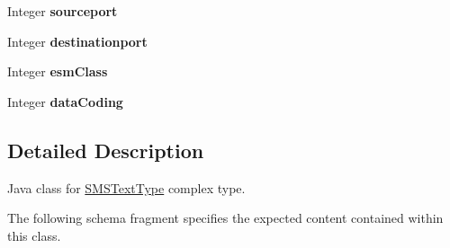 \begin{DoxyCompactItemize}
\item 
\hypertarget{classcom_1_1telefonica_1_1schemas_1_1unica_1_1rest_1_1sms_1_1v1_1_1SMSTextType_ae127e0cdb6047f940c4eda856bb84099}{
Integer {\bfseries sourceport}}
\label{classcom_1_1telefonica_1_1schemas_1_1unica_1_1rest_1_1sms_1_1v1_1_1SMSTextType_ae127e0cdb6047f940c4eda856bb84099}

\item 
\hypertarget{classcom_1_1telefonica_1_1schemas_1_1unica_1_1rest_1_1sms_1_1v1_1_1SMSTextType_a1b0b39268b50709344c75dd1e8c06da8}{
Integer {\bfseries destinationport}}
\label{classcom_1_1telefonica_1_1schemas_1_1unica_1_1rest_1_1sms_1_1v1_1_1SMSTextType_a1b0b39268b50709344c75dd1e8c06da8}

\item 
\hypertarget{classcom_1_1telefonica_1_1schemas_1_1unica_1_1rest_1_1sms_1_1v1_1_1SMSTextType_a704ff2366d584afc18db697e1a614b44}{
Integer {\bfseries esmClass}}
\label{classcom_1_1telefonica_1_1schemas_1_1unica_1_1rest_1_1sms_1_1v1_1_1SMSTextType_a704ff2366d584afc18db697e1a614b44}

\item 
\hypertarget{classcom_1_1telefonica_1_1schemas_1_1unica_1_1rest_1_1sms_1_1v1_1_1SMSTextType_a149d40798dbd156c06a8cc76a83bb587}{
Integer {\bfseries dataCoding}}
\label{classcom_1_1telefonica_1_1schemas_1_1unica_1_1rest_1_1sms_1_1v1_1_1SMSTextType_a149d40798dbd156c06a8cc76a83bb587}

\end{DoxyCompactItemize}


\subsection{Detailed Description}
Java class for \hyperlink{classcom_1_1telefonica_1_1schemas_1_1unica_1_1rest_1_1sms_1_1v1_1_1SMSTextType}{SMSTextType} complex type.

The following schema fragment specifies the expected content contained within this class.


